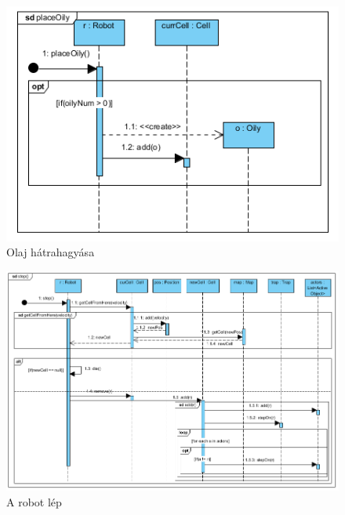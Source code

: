\begin{figure}[!htbp]
	\begin{center}
		\includegraphics[width=166mm, center]{./vegleges_statikus_seq/placeoily.png}
		\caption{Olaj hátrahagyása}
	\end{center}
\end{figure}



\begin{figure}[!htbp]
	\begin{center}
		\includegraphics[width=166mm, center]{./vegleges_statikus_seq/step.png}
		\caption{A robot lép}
	\end{center}
\end{figure}


